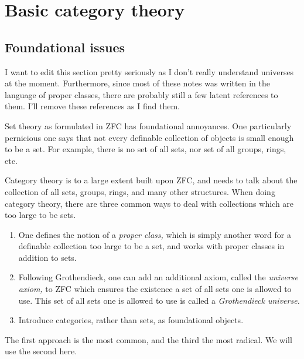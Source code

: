\documentclass[notes.tex]{subfiles}
\begin{document}
\chapter{Basic category theory}\label{ch:categories}

\section{Foundational issues}
\label{sec:foundational_issues}

\begin{note}
  I want to edit this section pretty seriously as I don't really understand universes at the moment. Furthermore, since most of these notes was written in the language of proper classes, there are probably still a few latent references to them. I'll remove these references as I find them.
\end{note}

Set theory as formulated in ZFC has foundational annoyances. One particularly pernicious one says that not every definable collection of objects is small enough to be a set. For example, there is no set of all sets, nor set of all groups, rings, etc.

Category theory is to a large extent built upon ZFC, and needs to talk about the collection of all sets, groups, rings, and many other structures. When doing category theory, there are three common ways to deal with collections which are too large to be sets.
\begin{enumerate}
  \item One defines the notion of a \emph{proper class,} which is simply another word for a definable collection too large to be a set, and works with proper classes in addition to sets.

  \item Following Grothendieck, one can add an additional axiom, called the \emph{universe axiom,} to ZFC which ensures the existence a set of all sets one is allowed to use. This set of all sets one is allowed to use is called a \emph{Grothendieck universe.}

  \item Introduce categories, rather than sets, as foundational objects.
\end{enumerate}

The first approach is the most common, and the third the most radical. We will use the second here.
\end{document}
